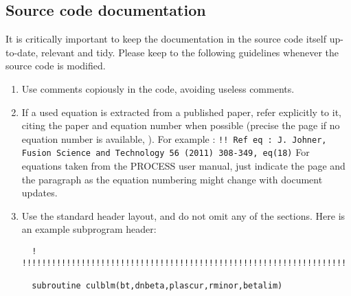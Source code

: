 \documentclass[11pt,a4paper]{report}
\begin{document}
\subsection{Source code documentation}

It is critically important to keep the documentation in the source code itself
up-to-date, relevant and tidy. Please keep to the following guidelines
whenever the source code is modified.
\begin{enumerate}

\item Use comments copiously in the code, avoiding useless comments.
	
\item If a used equation is extracted from a published paper, refer explicitly to it,
  citing the paper and equation number when possible (precise the page if no equation number is available, ). 
  For example : \newline
  \texttt{!! Ref eq : J. Johner, Fusion Science and Technology 56 (2011) 308-349, eq(18)}\newline
  For equations taken from the PROCESS user manual, just indicate the page and the paragraph as the equation numbering might change with document updates.
	
\item Use the standard header layout, and do not omit any of the
  sections. Here is an example subprogram header:
\footnotesize
\begin{verbatim}
  ! !!!!!!!!!!!!!!!!!!!!!!!!!!!!!!!!!!!!!!!!!!!!!!!!!!!!!!!!!!!!!!!!!!

  subroutine culblm(bt,dnbeta,plascur,rminor,betalim)


\end{verbatim}
\end{enumerate}
\end{document}
